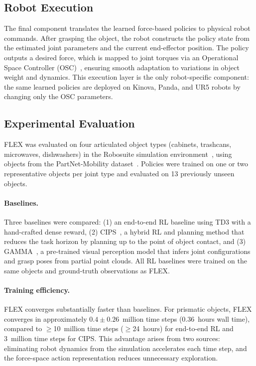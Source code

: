 


\subsection{Robot Execution}
\label{sec:flex_execution}

The final component translates the learned force-based policies to physical robot commands. After grasping the object, the robot constructs the policy state from the estimated joint parameters and the current end-effector position. The policy outputs a desired force, which is mapped to joint torques via an Operational Space Controller (OSC)~\citep{khatib1987osc}, ensuring smooth adaptation to variations in object weight and dynamics. This execution layer is the only robot-specific component: the same learned policies are deployed on Kinova, Panda, and UR5 robots by changing only the OSC parameters.

\subsection{Experimental Evaluation}
\label{sec:flex_results}

FLEX was evaluated on four articulated object types (cabinets, trashcans, microwaves, dishwashers) in the Robosuite simulation environment~\citep{zhu2020robosuite}, using objects from the PartNet-Mobility dataset~\citep{xiang2020sapien}. Policies were trained on one or two representative objects per joint type and evaluated on 13 previously unseen objects.

\paragraph{Baselines.} Three baselines were compared: (1) an end-to-end RL baseline using TD3 with a hand-crafted dense reward, (2) CIPS~\citep{rosen2022role}, a hybrid RL and planning method that reduces the task horizon by planning up to the point of object contact, and (3) GAMMA~\citep{yu2024gamma}, a pre-trained visual perception model that infers joint configurations and grasp poses from partial point clouds. All RL baselines were trained on the same objects and ground-truth observations as FLEX.

\paragraph{Training efficiency.} FLEX converges substantially faster than baselines. For prismatic objects, FLEX converges in approximately $0.4 \pm 0.26$~million time steps (0.36~hours wall time), compared to $\geq$10~million time steps ($\geq$24~hours) for end-to-end RL and 3~million time steps for CIPS. This advantage arises from two sources: eliminating robot dynamics from the simulation accelerates each time step, and the force-space action representation reduces unnecessary exploration.


